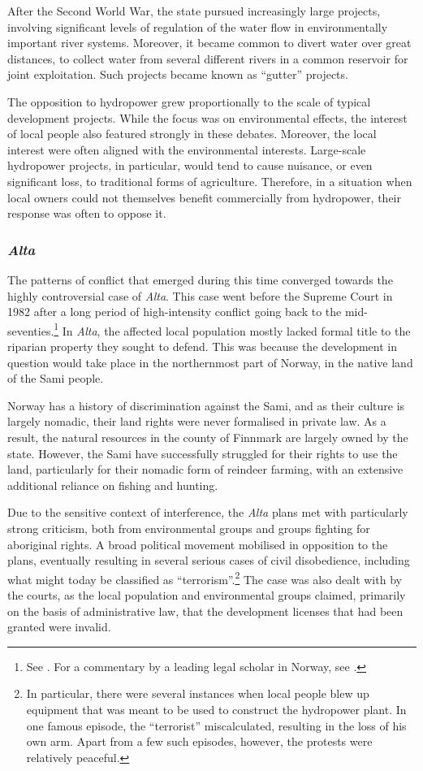 After the Second World War, the state pursued increasingly large projects, involving significant levels of regulation of the water flow in environmentally important river systems. Moreover, it became common to divert water over great distances, to collect water from several different rivers in a common reservoir for joint exploitation. Such projects became known as ``gutter'' projects.

The opposition to hydropower grew proportionally to the scale of typical development projects. While the focus was on environmental effects, the interest of local people also featured strongly in these debates. Moreover, the local interest were often aligned with the environmental interests. Large-scale hydropower projects, in particular, would tend to cause nuisance, or even significant loss, to traditional forms of agriculture. Therefore, in a situation when local owners could not themselves benefit commercially  from hydropower, their response was often to oppose it.

\subsubsection{{\it Alta}}\label{sec:alta}

The patterns of conflict that emerged during this time converged towards the highly controversial case of {\it Alta}. This case went before the Supreme Court in 1982 after a long period of high-intensity conflict going back to the mid-seventies.\footnote{See \cite{alta82}. For a commentary by a leading legal scholar in Norway, see \cite{eckhoff82}.} In {\it Alta}, the affected local population mostly lacked formal title to the riparian property they sought to defend. This was because the development in question would take place in the northernmost part of Norway, in the native land of the Sami people.

Norway has a history of discrimination against the Sami, and as their culture is largely nomadic, their land rights were never formalised in private law. As a result, the natural resources in the county of Finnmark are largely owned by the state. However, the Sami have successfully struggled for their rights to use the land, particularly for their nomadic form of reindeer farming, with an extensive additional reliance on fishing and hunting.

Due to the sensitive context of interference, the {\it Alta} plans met with particularly strong criticism, both from environmental groups and groups fighting for aboriginal rights. A broad political movement mobilised in opposition to the plans, eventually resulting in several serious cases of civil disobedience, including what might today be classified as ``terrorism''.\footnote{In particular, there were several instances when local people blew up equipment that was meant to be used to construct the hydropower plant. In one famous episode, the ``terrorist'' miscalculated, resulting in the loss of his own arm. Apart from a few such episodes, however, the protests were relatively peaceful.} The case was also dealt with by the courts, as the local population and environmental groups claimed, primarily on the basis of administrative law, that the development licenses that had been granted were invalid.

